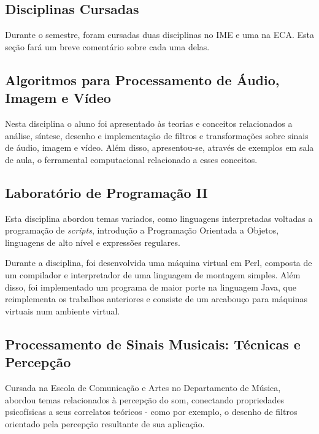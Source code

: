 \documentclass[a4paper, 11pt, twoside]{article}
\begin{document}
\begin{figure}[H]
  \centering
  \label{fig2}
\end{figure}
\begin{multicols}{2}

\newpage
\section{Disciplinas Cursadas}

Durante o semestre, foram cursadas duas disciplinas no IME e uma na ECA.
Esta seção fará um breve comentário sobre cada uma delas.

\subsection{Algoritmos para Processamento de Áudio, Imagem e Vídeo}

Nesta disciplina o aluno foi apresentado às teorias e conceitos relacionados 
a análise, síntese, desenho e implementação de filtros e transformações sobre 
sinais de áudio, imagem e vídeo. Além disso, apresentou-se, através
de exemplos em sala de aula, o ferramental computacional relacionado a 
esses conceitos.

\subsection{Laboratório de Programação II}

Esta disciplina abordou temas variados, como linguagens interpretadas voltadas a
programação de \textit{scripts}, introdução a Programação Orientada 
a Objetos, linguagens de alto nível e expressões regulares.

Durante a disciplina, foi desenvolvida uma máquina virtual em Perl,
composta de um compilador e interpretador de uma
linguagem de montagem simples. Além disso, foi implementado um programa
de maior porte na linguagem Java, que reimplementa os trabalhos anteriores
e consiste de um arcabouço para máquinas virtuais num ambiente virtual.

\subsection{Processamento de Sinais Musicais: Técnicas e Percepção}

Cursada na Escola de Comunicação e Artes no Departamento de Música, abordou 
temas relacionados à percepção do som, conectando propriedades psicofísicas 
a seus correlatos teóricos - como por exemplo, o desenho de filtros orientado
pela percepção resultante de sua aplicação.


\end{multicols}
\end{document}

